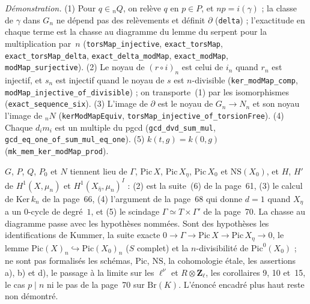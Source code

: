 {\small \emph{Démonstration.} (1) Pour $q \in {}_nQ$, on relève $q$ en $p \in P$, et $np = i(\gamma)$ ; la classe de $\gamma$ dans $G_n$ ne dépend pas des relèvements et définit $\partial$ (\texttt{delta}) ; l'exactitude en chaque terme est la chasse au diagramme du lemme du serpent pour la multiplication par~$n$ (\texttt{torsMap\_injective}, \texttt{exact\_torsMap}, \texttt{exact\_torsMap\_delta}, \texttt{exact\_delta\_modMap}, \texttt{exact\_modMap}, \texttt{modMap\_surjective}). (2) Le noyau de $(r \circ i)_n$ est celui de $i_n$ quand $r_n$ est injectif, et $s_n$ est injectif quand le noyau de $s$ est $n$-divisible (\texttt{ker\_modMap\_comp}, \texttt{modMap\_injective\_of\_divisible}) ; on transporte~(1) par les isomorphismes (\texttt{exact\_sequence\_six}). (3) L'image de $\partial$ est le noyau de $G_n \to N_n$ et son noyau l'image de ${}_nN$ (\texttt{kerModMapEquiv}, \texttt{torsMap\_injective\_of\_torsionFree}). (4) Chaque $d_i m_i$ est un multiple du pgcd (\texttt{gcd\_dvd\_sum\_mul}, \texttt{gcd\_eq\_one\_of\_sum\_mul\_eq\_one}). (5) $k(t, g) = k(0, g)$ (\texttt{mk\_mem\_ker\_modMap\_prod}).

$G$, $P$, $Q$, $P_0$ et $N$ tiennent lieu de $\Gamma$, $\mathrm{Pic}\,X$, $\mathrm{Pic}\,X_\eta$, $\mathrm{Pic}\,X_0$ et $\mathrm{NS}(X_0)$, et $H$, $H'$ de $H^1(X, \mu_n)$ et $H^1(X_{\bar\eta}, \mu_n)^I$ : (2) est la suite~(6) de la page~61, (3) le calcul de $\mathrm{Ker}\,k_n$ de la page~66, (4) l'argument de la page~68 qui donne $d = 1$ quand $X_\eta$ a un $0$-cycle de degré~$1$, et (5) le scindage $\Gamma \simeq T \times \Gamma'$ de la page~70. La chasse au diagramme passe avec les hypothèses nommées. Sont des hypothèses les identifications de Kummer, la suite exacte $0 \to \Gamma \to \mathrm{Pic}\,X \to \mathrm{Pic}\,X_\eta \to 0$, le lemme $\mathrm{Pic}(X)_n \hookrightarrow \mathrm{Pic}(X_0)_n$ ($S$ complet) et la $n$-divisibilité de $\mathrm{Pic}^0(X_0)$ ; ne sont pas formalisés les schémas, $\mathrm{Pic}$, $\mathrm{NS}$, la cohomologie étale, les assertions a), b) et d), le passage à la limite sur les $\ell^\nu$ et $R \otimes \mathbf Z_\ell$, les corollaires 9, 10 et~15, le cas $p \mid n$ ni le pas de la page~70 sur $\mathrm{Br}(K)$. L'énoncé encadré plus haut reste non démontré.\par}

